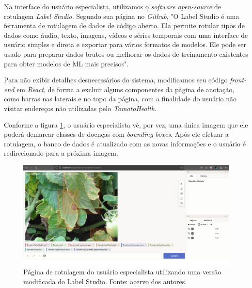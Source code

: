 Na interface do usuário especialista, utilizamos o \textit{software open-source} de rotulagem \emph{Label Studio}. Segundo sua página no \emph{Github}, "O Label Studio é uma ferramenta de rotulagem de dados de código aberto. Ela permite rotular tipos de dados como áudio, texto, imagens, vídeos e séries temporais com uma interface de usuário simples e direta e exportar para vários formatos de modelos. Ele pode ser usado para preparar dados brutos ou melhorar os dados de treinamento existentes para obter modelos de ML mais precisos".

Para não exibir detalhes desnecessários do sistema, modificamos seu código \textit{front-end} em \emph{React}, de forma a excluir alguns componentes da página de anotação, como barras nas laterais e no topo da página, com a finalidade do usuário não visitar endereços não utilizadas pelo \emph{TomatoHealth}.

Conforme a figura \ref{fig:rotulagem_labelstudio}, o usuário especialista vê, por vez, uma única imagem que ele poderá demarcar classes de doenças com \textit{bounding boxes}. Após ele efetuar a rotulagem, o banco de dados é atualizado com as novas informações e o usuário é redirecionado para a próxima imagem.

\begin{figure}[htbp]
    \centering
    \includegraphics[width=1\linewidth]{images/rotulagem_labelstudio.jpg}
    \caption{\label{fig:rotulagem_labelstudio} Página de rotulagem do usuário especialista utilizando uma versão modificada do Label Studio. Fonte: acervo dos autores.}
\end{figure}
